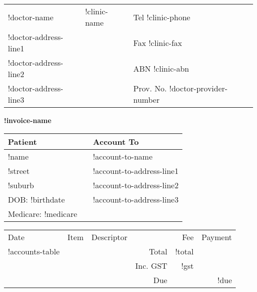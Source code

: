 \documentclass[12pt]{article}
\begin{document}
\begin{center}
\begin{tabular}{p{}>{\centering}p{}<{\centering}p{}<{\raggedleft}}
!doctor-name & {\Large !clinic-name } & Tel !clinic-phone \\
!doctor-address-line1 &  & Fax !clinic-fax \\
!doctor-address-line2 & & ABN !clinic-abn \\
!doctor-address-line3 & & Prov. No. !doctor-provider-number\\ 
\hline
\end{tabular}

\vspace{7mm}

{ \Large \textbf{!invoice-name} }

\end{center}

\vspace{7mm}

\begin{tabular}{lp{5mm}l} 
Patient & & Account To \\ \midrule
!name & & !account-to-name\\
!street & & !account-to-address-line1 \\
!suburb & & !account-to-address-line2 \\
DOB: !birthdate &  & !account-to-address-line3 \\
Medicare:   !medicare & &   \\
\end{tabular}

\vspace{7mm}

\begin{tabularx}{\textwidth}{llXrrr}
Date & Item & Descriptor & & Fee & Payment \\ \cmidrule(l){1-6}
!accounts-table
\cmidrule(l){5-6}
& & & Total & !total  & \\
& & & Inc. GST & !gst & \\ \cmidrule(l){5-6}
& & & Due & & !due \\

\end{tabularx}
\end{document}
